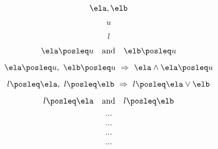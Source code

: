 \begin{forslides}
     \begin{equation}
        \label{eq:slides_adjunctions_33}
       \ela, \elb
    \end{equation}
    
     \begin{equation}
        \label{eq:slides_adjunctions_34}
       u
    \end{equation}
    
     \begin{equation}
        \label{eq:slides_adjunctions_35}
      l
    \end{equation}
    
     \begin{equation}
        \label{eq:slides_adjunctions_36}
      \ela \posleq u \quad \text{and} \quad \elb \posleq u
    \end{equation}
    
     \begin{equation}
        \label{eq:slides_adjunctions_37}
     \ela \posleq u, \ \elb \posleq u \ \Rightarrow \ \ela \wedge \ela \posleq u
    \end{equation}
    
     \begin{equation}
        \label{eq:slides_adjunctions_38}
       l \posleq \ela, \ l \posleq \elb  \ \Rightarrow \  l \posleq \ela \vee \elb
    \end{equation}
    
    \begin{equation}
        \label{eq:slides_adjunctions_39}
       l \posleq \ela \quad \text{and} \quad l \posleq \elb
    \end{equation}
    
     \begin{equation}
        \label{eq:slides_adjunctions_40}
       ...
    \end{equation}
    
     \begin{equation}
        \label{eq:slides_adjunctions_41}
       ...
    \end{equation}
    
     \begin{equation}
        \label{eq:slides_adjunctions_42}
       ...
    \end{equation}
    
     \begin{equation}
        \label{eq:slides_adjunctions_43}
       ...
    \end{equation}
    

\end{forslides}

